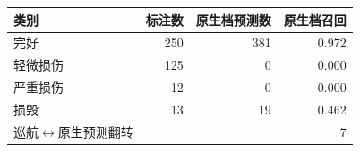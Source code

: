 \begin{tabular}{lrrr}
\hline
类别 & 标注数 & 原生档预测数 & 原生档召回 \\
\hline
完好 & 250 & 381 & 0.972 \\
轻微损伤 & 125 & 0 & 0.000 \\
严重损伤 & 12 & 0 & 0.000 \\
损毁 & 13 & 19 & 0.462 \\
\hline
巡航$\leftrightarrow$原生预测翻转 & \multicolumn{3}{r}{7} \\
\hline
\end{tabular}
